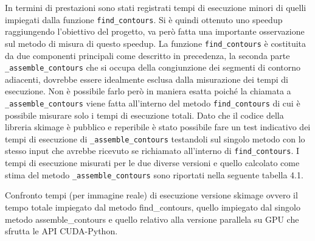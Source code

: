 \documentclass[12pt,a4paper]{report}
\begin{document}
{\begin{figure}[H]
\begin{floatrow}[1]
\end{floatrow}
\end{figure} 
\newpage
In termini di prestazioni sono stati registrati tempi di esecuzione minori di quelli impiegati dalla funzione \verb|find_contours|. Si è quindi ottenuto uno speedup raggiungendo l'obiettivo del progetto, va però fatta una importante osservazione sul metodo di misura di questo speedup. \newline
La funzione \verb|find_contours| è costituita da due componenti principali come descritto in precedenza, la seconda parte \verb|_assemble_contours| che si occupa della congiunzione dei segmenti di contorno adiacenti, dovrebbe essere idealmente esclusa dalla misurazione dei tempi di esecuzione. Non è possibile farlo però in maniera esatta poiché la chiamata a \verb|_assemble_contours| viene fatta all'interno del metodo \verb|find_contours| di cui è possibile misurare solo i tempi di esecuzione totali. Dato che il codice della libreria skimage è pubblico e reperibile è stato possibile fare un test indicativo dei tempi di esecuzione di \verb|_assemble_contours| testandoli sul singolo metodo con lo stesso input che avrebbe ricevuto se richiamato all'interno di \verb|find_contours|. 
I tempi di esecuzione misurati per le due diverse versioni e quello calcolato come stima del metodo \verb|_assemble_contours| sono riportati nella seguente tabella 4.1. 

\begin{table}[h]
\centering
\setlength\tabcolsep{0pt} %
\caption{Confronto tempi (per immagine reale) di esecuzione versione skimage ovvero il tempo totale impiegato dal metodo find\_contours, quello impiegato dal singolo metodo assemble\_contours e quello relativo alla versione parallela su GPU che sfrutta le API CUDA-Python.}
\label{t2}


\end{table}}
\end{document}
